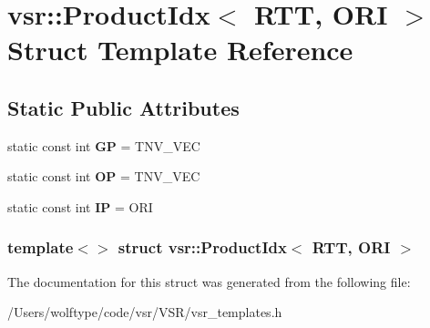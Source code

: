 \hypertarget{structvsr_1_1_product_idx_3_01_r_t_t_00_01_o_r_i_01_4}{\section{vsr\-:\-:Product\-Idx$<$ R\-T\-T, O\-R\-I $>$ Struct Template Reference}
\label{structvsr_1_1_product_idx_3_01_r_t_t_00_01_o_r_i_01_4}
}
\subsection*{Static Public Attributes}
\begin{DoxyCompactItemize}
\item 
\hypertarget{structvsr_1_1_product_idx_3_01_r_t_t_00_01_o_r_i_01_4_ae420236f33d2d6a3b1fbd25c3b1bacf8}{static const int {\bfseries G\-P} = T\-N\-V\-\_\-\-V\-E\-C}\label{structvsr_1_1_product_idx_3_01_r_t_t_00_01_o_r_i_01_4_ae420236f33d2d6a3b1fbd25c3b1bacf8}

\item 
\hypertarget{structvsr_1_1_product_idx_3_01_r_t_t_00_01_o_r_i_01_4_a7a84ce4f79acdf1cad09ce025b0b7004}{static const int {\bfseries O\-P} = T\-N\-V\-\_\-\-V\-E\-C}\label{structvsr_1_1_product_idx_3_01_r_t_t_00_01_o_r_i_01_4_a7a84ce4f79acdf1cad09ce025b0b7004}

\item 
\hypertarget{structvsr_1_1_product_idx_3_01_r_t_t_00_01_o_r_i_01_4_ab2702cd012742262be7d9f7929f1c9c3}{static const int {\bfseries I\-P} = O\-R\-I}\label{structvsr_1_1_product_idx_3_01_r_t_t_00_01_o_r_i_01_4_ab2702cd012742262be7d9f7929f1c9c3}

\end{DoxyCompactItemize}
\subsubsection*{template$<$$>$ struct vsr\-::\-Product\-Idx$<$ R\-T\-T, O\-R\-I $>$}



The documentation for this struct was generated from the following file\-:\begin{DoxyCompactItemize}
\item 
/\-Users/wolftype/code/vsr/\-V\-S\-R/vsr\-\_\-templates.\-h\end{DoxyCompactItemize}
